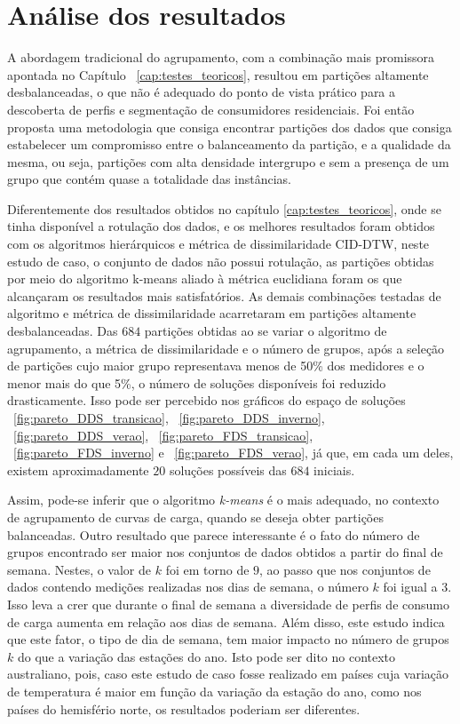 \section{Análise dos resultados}

A abordagem tradicional do agrupamento, com a combinação mais promissora apontada no Capítulo ~\ref{cap:testes_teoricos}, resultou em partições altamente desbalanceadas, o que não é adequado do ponto de vista prático para a descoberta de perfis e segmentação de consumidores residenciais. Foi então proposta uma metodologia que consiga encontrar partições dos dados que consiga estabelecer um compromisso entre o balanceamento da partição, e a qualidade da mesma, ou seja, partições com alta densidade intergrupo e sem a presença de um grupo que contém quase a totalidade das instâncias.

Diferentemente dos resultados obtidos no capítulo \ref{cap:testes_teoricos}, onde se tinha disponível a rotulação dos dados, e os melhores resultados foram obtidos com os algoritmos hierárquicos e métrica de dissimilaridade CID-DTW, neste estudo de caso, o conjunto de dados não possui rotulação, as partições obtidas por meio do algoritmo k-means aliado à métrica euclidiana foram os que alcançaram os resultados mais satisfatórios. As demais combinações testadas de algoritmo e métrica de dissimilaridade acarretaram em partições altamente desbalanceadas. Das $684$ partições obtidas ao se variar o algoritmo de agrupamento, a métrica de dissimilaridade e o número de grupos, após a seleção de partições cujo maior grupo representava menos de 50\% dos medidores e o menor mais do que 5\%, o número de soluções disponíveis foi reduzido drasticamente. Isso pode ser percebido nos gráficos do espaço de soluções ~\ref{fig:pareto_DDS_transicao},  ~\ref{fig:pareto_DDS_inverno}, ~\ref{fig:pareto_DDS_verao}, ~\ref{fig:pareto_FDS_transicao}, ~\ref{fig:pareto_FDS_inverno} e ~\ref{fig:pareto_FDS_verao}, já que, em cada um deles, existem aproximadamente $20$ soluções possíveis das $684$ iniciais.

Assim, pode-se inferir que o algoritmo \emph{k-means} é o mais adequado, no contexto de agrupamento de curvas de carga, quando se deseja obter partições balanceadas. Outro resultado que parece interessante é o fato do número de grupos encontrado ser maior nos conjuntos de dados obtidos a partir do final de semana. Nestes, o valor de $k$ foi em torno de $9$, ao passo que nos conjuntos de dados contendo medições realizadas nos dias de semana, o número $k$ foi igual a 3. Isso leva a crer que durante o final de semana a diversidade de perfis de consumo de carga aumenta em relação aos dias de semana. Além disso, este estudo indica que este fator, o tipo de dia de semana, tem maior impacto no número de grupos $k$ do que a variação das estações do ano. Isto pode ser dito no contexto australiano, pois, caso este estudo de caso fosse realizado em países cuja variação de temperatura é maior em função da variação da estação do ano, como nos países do hemisfério norte, os resultados poderiam ser diferentes.

